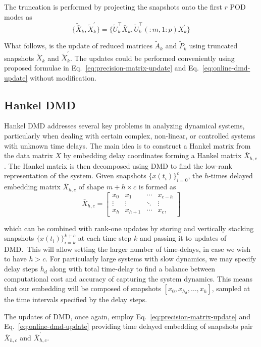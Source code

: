 The truncation is performed by projecting the snapshots onto the first \(r\) POD modes as
\begin{equation}
    \{\tilde{\bar{X}}_k, \tilde{X}^\prime_k\} = \{\tilde{U}^\top_k\bar{X}_k, \tilde{U}^\top_k(:m, 1:p)X^\prime_k\}
\end{equation}

What follows, is the update of reduced matrices \(\tilde{A}_k\) and \(\tilde{P}_k\) using truncated snapshots \(\tilde{X}_k\) and \(\tilde{X}^\prime_k\). The updates could be performed conveniently using proposed formulae in Eq.~\eqref{eq:precision-matrix-update} and Eq.~\eqref{eq:online-dmd-update} without modification.

\subsection{Hankel DMD}\label{sec:hankel-dmd}
Hankel DMD addresses several key problems in analyzing dynamical systems, particularly when dealing with certain complex, non-linear, or controlled systems with unknown time delays. The main idea is to construct a Hankel matrix from the data matrix \(X\) by embedding delay coordinates forming a Hankel matrix \(\bar{X}_{h, c}\). The Hankel matrix is then decomposed using DMD to find the low-rank representation of the system. Given snapshots \({\{x(t_i)\}}^c_{i=0}\), the \(h\)-times delayed embedding matrix \(\bar{X}_{h, c}\) of shape \(m + h \times c\) is formed as
\begin{equation}\label{eq:hankel}
    \bar{X}_{h, c} = \begin{bmatrix}
        x_0    & x_1       & \cdots & x_{c - h} \\
        \vdots & \vdots    & \ddots & \vdots    \\
        x_{h}  & x_{h + 1} & \cdots & x_{c},
    \end{bmatrix}
\end{equation}

which can be combined with rank-one updates by storing and vertically stacking snapshots \({\{x(t_i)\}}^{k+c}_{i=k}\) at each time step \(k\) and passing it to updates of DMD.~This will allow setting the larger number of time-delays, in case we wish to have \(h > c\). For particularly large systems with slow dynamics, we may specify delay steps \(h_d\) along with total time-delay to find a balance between computational cost and accuracy of capturing the system dynamics. This means that our embedding will be composed of snapshots \( [x_0, x_{h_d}, \ldots, x_h] \), sampled at the time intervals specified by the delay steps.

The updates of DMD, once again, employ Eq.~\eqref{eq:precision-matrix-update} and Eq.~\eqref{eq:online-dmd-update} providing time delayed embedding of snapshots pair \(\bar{X}_{h, c}\) and \(\bar{X}^\prime_{h, c}\).
